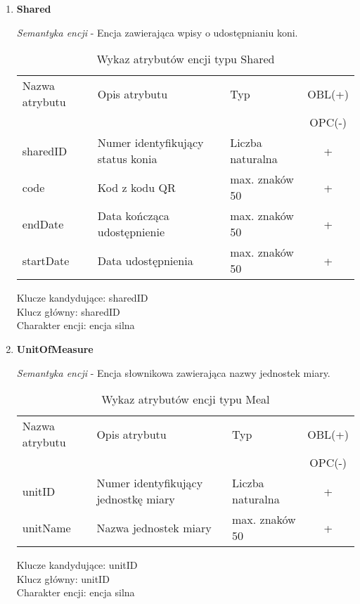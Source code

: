 \documentclass[12pt,twoside]{report}
\begin{document}
\begin{enumerate}[start=10,label={\bfseries ENC$\backslash$0\arabic*}]
\item \textbf{Shared}

\textit{Semantyka encji} - Encja zawierająca wpisy o udostępnianiu koni.

\begin{table}[h!]
	\centering
	\begin{tabular}{|l|l|l|c|}
		\hline
		Nazwa atrybutu & Opis atrybutu & Typ & OBL(+) \\
		& & &  OPC(-) \\
		\hline
		sharedID & Numer identyfikujący status konia & Liczba naturalna & + \\
		\hline
		code &  Kod z kodu QR & max. znaków 50 & + \\
		\hline
		endDate &  Data kończąca udostępnienie & max. znaków 50 & + \\
		\hline
		startDate &  Data udostępnienia & max. znaków 50 & + \\
		\hline
	\end{tabular}
	\caption{Wykaz atrybutów encji typu Shared }
\end{table}
Klucze kandydujące: sharedID \\
Klucz główny: sharedID \\
Charakter encji: encja silna \\


\item \textbf{UnitOfMeasure}

\textit{Semantyka encji} - Encja słownikowa zawierająca nazwy jednostek miary.

\begin{table}[h!]
	\centering
	\begin{tabular}{|l|l|l|c|}
		\hline
		Nazwa atrybutu & Opis atrybutu & Typ & OBL(+) \\
		& & &  OPC(-) \\
		\hline
		unitID & Numer identyfikujący jednostkę miary & Liczba naturalna & + \\
		\hline
		unitName & Nazwa jednostek miary & max. znaków 50 & + \\
		\hline
	\end{tabular}
	\caption{Wykaz atrybutów encji typu Meal }
\end{table}
Klucze kandydujące: unitID \\
Klucz główny: unitID \\
Charakter encji: encja silna \\



\end{enumerate}
\end{document}
